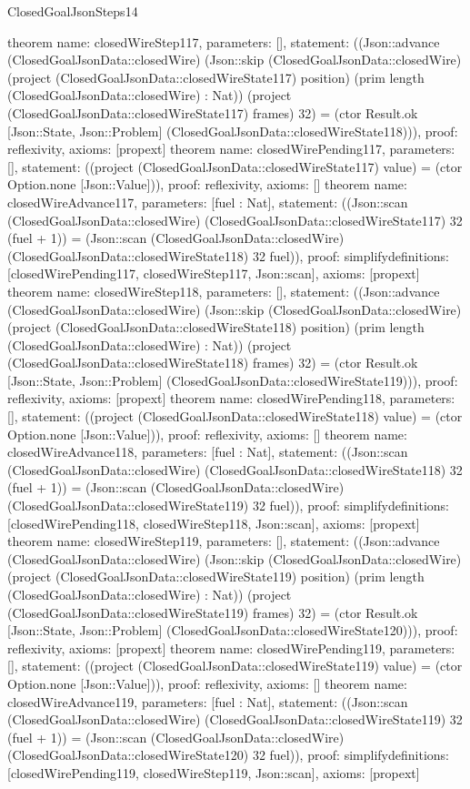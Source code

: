 \begin{lexlean}{ClosedGoalJsonSteps14}
\begin{semanticmodule}
{}
theorem{
 name: closedWireStep117, parameters: [],
 statement: ((Json::advance (ClosedGoalJsonData::closedWire) (Json::skip (ClosedGoalJsonData::closedWire) (project (ClosedGoalJsonData::closedWireState117) position) (prim length (ClosedGoalJsonData::closedWire) : Nat)) (project (ClosedGoalJsonData::closedWireState117) frames) 32) = (ctor Result.ok [Json::State, Json::Problem] (ClosedGoalJsonData::closedWireState118))), proof: reflexivity{}, axioms: [propext]
}
theorem{
 name: closedWirePending117, parameters: [],
 statement: ((project (ClosedGoalJsonData::closedWireState117) value) = (ctor Option.none [Json::Value])), proof: reflexivity{}, axioms: []
}
theorem{
 name: closedWireAdvance117, parameters: [fuel : Nat],
 statement: ((Json::scan (ClosedGoalJsonData::closedWire) (ClosedGoalJsonData::closedWireState117) 32 (fuel + 1)) = (Json::scan (ClosedGoalJsonData::closedWire) (ClosedGoalJsonData::closedWireState118) 32 fuel)), proof: simplify{definitions: [closedWirePending117, closedWireStep117, Json::scan]}, axioms: [propext]
}
theorem{
 name: closedWireStep118, parameters: [],
 statement: ((Json::advance (ClosedGoalJsonData::closedWire) (Json::skip (ClosedGoalJsonData::closedWire) (project (ClosedGoalJsonData::closedWireState118) position) (prim length (ClosedGoalJsonData::closedWire) : Nat)) (project (ClosedGoalJsonData::closedWireState118) frames) 32) = (ctor Result.ok [Json::State, Json::Problem] (ClosedGoalJsonData::closedWireState119))), proof: reflexivity{}, axioms: [propext]
}
theorem{
 name: closedWirePending118, parameters: [],
 statement: ((project (ClosedGoalJsonData::closedWireState118) value) = (ctor Option.none [Json::Value])), proof: reflexivity{}, axioms: []
}
theorem{
 name: closedWireAdvance118, parameters: [fuel : Nat],
 statement: ((Json::scan (ClosedGoalJsonData::closedWire) (ClosedGoalJsonData::closedWireState118) 32 (fuel + 1)) = (Json::scan (ClosedGoalJsonData::closedWire) (ClosedGoalJsonData::closedWireState119) 32 fuel)), proof: simplify{definitions: [closedWirePending118, closedWireStep118, Json::scan]}, axioms: [propext]
}
theorem{
 name: closedWireStep119, parameters: [],
 statement: ((Json::advance (ClosedGoalJsonData::closedWire) (Json::skip (ClosedGoalJsonData::closedWire) (project (ClosedGoalJsonData::closedWireState119) position) (prim length (ClosedGoalJsonData::closedWire) : Nat)) (project (ClosedGoalJsonData::closedWireState119) frames) 32) = (ctor Result.ok [Json::State, Json::Problem] (ClosedGoalJsonData::closedWireState120))), proof: reflexivity{}, axioms: [propext]
}
theorem{
 name: closedWirePending119, parameters: [],
 statement: ((project (ClosedGoalJsonData::closedWireState119) value) = (ctor Option.none [Json::Value])), proof: reflexivity{}, axioms: []
}
theorem{
 name: closedWireAdvance119, parameters: [fuel : Nat],
 statement: ((Json::scan (ClosedGoalJsonData::closedWire) (ClosedGoalJsonData::closedWireState119) 32 (fuel + 1)) = (Json::scan (ClosedGoalJsonData::closedWire) (ClosedGoalJsonData::closedWireState120) 32 fuel)), proof: simplify{definitions: [closedWirePending119, closedWireStep119, Json::scan]}, axioms: [propext]
}
\end{semanticmodule}
\end{lexlean}
